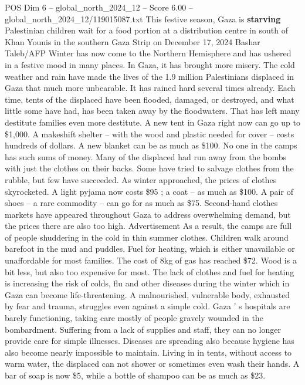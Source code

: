 \begin{textsample}{POS Dim 6 – global\_north\_2024\_12 – Score 6.00 – global\_north\_2024\_12/119015087.txt}  \label{ex:f6_pos_263}
This festive season, Gaza is \textbf{starving} Palestinian children wait for a food portion at a distribution centre in south of Khan Younis in the southern Gaza Strip on December 17, 2024 Bashar Taleb/AFP Winter has now come to the Northern Hemisphere and has ushered in a festive mood in many places.
In Gaza, it has brought more misery.
The cold weather and rain have made the lives of the 1.9 million Palestinians displaced in Gaza that much more unbearable.
It has rained hard several times already.
Each time, tents of the displaced have been flooded, damaged, or destroyed, and what little some have had, has been taken away by the floodwaters.
That has left many destitute families even more destitute.
A new tent in Gaza right now can go up to \$1,000.
A makeshift shelter -- with the wood and plastic needed for cover -- costs hundreds of dollars.
A new blanket can be as much as \$100.
No one in the camps has such sums of money.
Many of the displaced had run away from the bombs with just the clothes on their backs.
Some have tried to salvage clothes from the rubble, but few have succeeded.
As winter approached, the prices of clothes skyrocketed.
A light pyjama now costs \$95 ; a coat -- as much as \$100.
A pair of shoes -- a rare commodity -- can go for as much as \$75.
Second-hand clothes markets have appeared throughout Gaza to address overwhelming demand, but the prices there are also too high.
Advertisement As a result, the camps are full of people shuddering in the cold in thin summer clothes.
Children walk around barefoot in the mud and puddles.
Fuel for heating, which is either unavailable or unaffordable for most families.
The cost of 8kg of gas has reached \$72.
Wood is a bit less, but also too expensive for most.
The lack of clothes and fuel for heating is increasing the risk of colds, flu and other diseases during the winter which in Gaza can become life-threatening.
A malnourished, vulnerable body, exhausted by fear and trauma, struggles even against a simple cold.
Gaza ' s hospitals are barely functioning, taking care mostly of people gravely wounded in the bombardment.
Suffering from a lack of supplies and staff, they can no longer provide care for simple illnesses.
Diseases are spreading also because hygiene has also become nearly impossible to maintain.
Living in in tents, without access to warm water, the displaced can not shower or sometimes even wash their hands.
A bar of soap is now \$5, while a bottle of shampoo can be as much as \$23.

\end{textsample}
